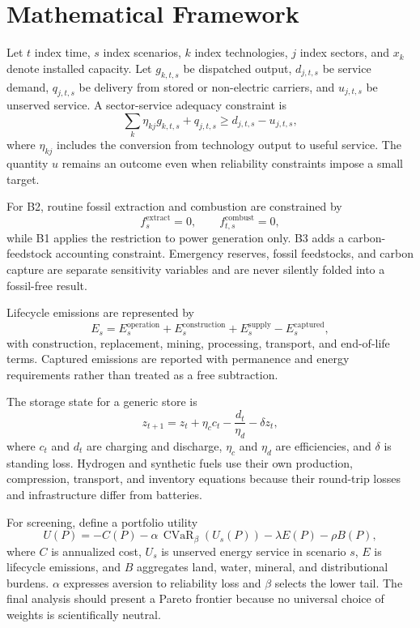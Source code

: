 \documentclass[conference]{IEEEtran}
\newcommand{\cvar}{\operatorname{CVaR}}
\begin{document}
\section{Mathematical Framework}
\label{sec:model}
Let $t$ index time, $s$ index scenarios, $k$ index technologies, $j$ index sectors, and $x_k$ denote installed capacity. Let $g_{k,t,s}$ be dispatched output, $d_{j,t,s}$ be service demand, $q_{j,t,s}$ be delivery from stored or non-electric carriers, and $u_{j,t,s}$ be unserved service. A sector-service adequacy constraint is
\begin{equation}
\sum_k \eta_{kj}g_{k,t,s}+q_{j,t,s}\ge d_{j,t,s}-u_{j,t,s},
\label{eq:adequacy}
\end{equation}
where $\eta_{kj}$ includes the conversion from technology output to useful service. The quantity $u$ remains an outcome even when reliability constraints impose a small target.

For B2, routine fossil extraction and combustion are constrained by
\begin{equation}
f^{\mathrm{extract}}_s=0,\qquad f^{\mathrm{combust}}_{t,s}=0,
\label{eq:fossil}
\end{equation}
while B1 applies the restriction to power generation only. B3 adds a carbon-feedstock accounting constraint. Emergency reserves, fossil feedstocks, and carbon capture are separate sensitivity variables and are never silently folded into a fossil-free result.

Lifecycle emissions are represented by
\begin{equation}
E_s=E^{\mathrm{operation}}_s+E^{\mathrm{construction}}_s+E^{\mathrm{supply}}_s-E^{\mathrm{captured}}_s,
\label{eq:lifecycle}
\end{equation}
with construction, replacement, mining, processing, transport, and end-of-life terms. Captured emissions are reported with permanence and energy requirements rather than treated as a free subtraction.

The storage state for a generic store is
\begin{equation}
z_{t+1}=z_t+\eta_c c_t-\frac{d_t}{\eta_d}-\delta z_t,
\label{eq:storage}
\end{equation}
where $c_t$ and $d_t$ are charging and discharge, $\eta_c$ and $\eta_d$ are efficiencies, and $\delta$ is standing loss. Hydrogen and synthetic fuels use their own production, compression, transport, and inventory equations because their round-trip losses and infrastructure differ from batteries.

For screening, define a portfolio utility
\begin{equation}
U(P)= -C(P)-\alpha\,\cvar_{\beta}\left(U_s(P)\right)-\lambda E(P)-\rho B(P),
\label{eq:utility}
\end{equation}
where $C$ is annualized cost, $U_s$ is unserved energy service in scenario $s$, $E$ is lifecycle emissions, and $B$ aggregates land, water, mineral, and distributional burdens. $\alpha$ expresses aversion to reliability loss and $\beta$ selects the lower tail. The final analysis should present a Pareto frontier because no universal choice of weights is scientifically neutral.
\end{document}
